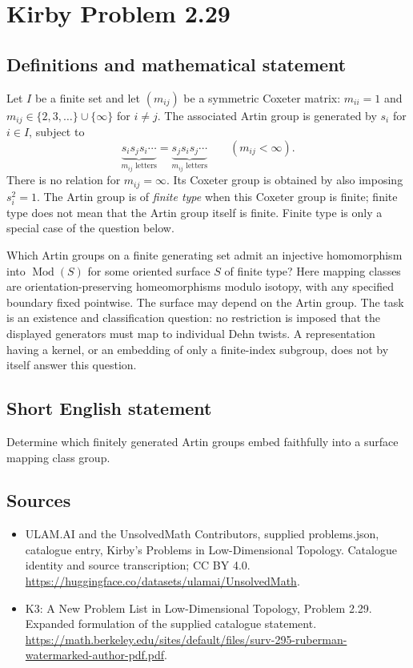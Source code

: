 \documentclass[11pt,a4paper]{article}
\begin{document}
\section*{Kirby Problem 2.29}\label{statement}

\subsection{Definitions and mathematical statement}
Let $I$ be a finite set and let $(m_{ij})$ be a symmetric Coxeter matrix:
$m_{ii}=1$ and $m_{ij}\in\{2,3,\ldots\}\cup\{\infty\}$ for $i\ne j$.
The associated Artin group is generated by $s_i$ for $i\in I$, subject to
\[
 \underbrace{s_i s_j s_i\cdots}_{m_{ij}\text{ letters}}
 =\underbrace{s_j s_i s_j\cdots}_{m_{ij}\text{ letters}}
 \qquad(m_{ij}<\infty).
\]
There is no relation for $m_{ij}=\infty$. Its Coxeter group is obtained by
also imposing $s_i^2=1$. The Artin group is of \emph{finite type} when this
Coxeter group is finite; finite type does not mean that the Artin group itself
is finite. Finite type is only a special case of the question below.

Which Artin groups on a finite generating set admit an injective homomorphism into
$\operatorname{Mod}(S)$ for some oriented surface $S$ of finite type?
Here mapping classes are orientation-preserving homeomorphisms modulo isotopy,
with any specified boundary fixed pointwise. The surface may depend on the
Artin group. The task is an existence and classification question: no restriction
is imposed that the displayed generators must map to individual Dehn twists.
A representation having a kernel, or an embedding of only a finite-index
subgroup, does not by itself answer this question.
\subsection{Short English statement}
Determine which finitely generated Artin groups embed faithfully into a surface mapping class group.
\subsection{Sources}
\begin{itemize}
\item[S1] ULAM.AI and the UnsolvedMath Contributors, supplied problems.json, catalogue entry, Kirby's Problems in Low-Dimensional Topology. Catalogue identity and source transcription; CC BY 4.0.
\url{https://huggingface.co/datasets/ulamai/UnsolvedMath}.
\item[S2] K3: A New Problem List in Low-Dimensional Topology, Problem 2.29. Expanded formulation of the supplied catalogue statement.
\url{https://math.berkeley.edu/sites/default/files/surv-295-ruberman-watermarked-author-pdf.pdf}.
\end{itemize}
\end{document}

